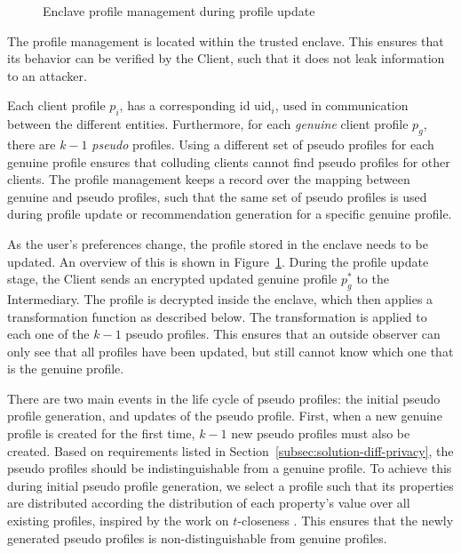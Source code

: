 {\begin{figure}[ht]
	\caption{Enclave profile management during profile update}
	\label{fig:impl-profilemanagement}
\end{figure}

The profile management is located within the trusted enclave.
This ensures that its behavior can be verified by the Client, such that it does not leak information to an attacker.

Each client profile $p_i$, has a corresponding id $\text{uid}_i$, used in communication between the different entities.
Furthermore, for each \emph{genuine} client profile $p_g$, there are $k-1$ \emph{pseudo} profiles.
Using a different set of pseudo profiles for each genuine profile ensures that colluding clients cannot find pseudo profiles for other clients.
The profile management keeps a record over the mapping between genuine and pseudo profiles, such that the same set of pseudo profiles is used during profile update or recommendation generation for a specific genuine profile.

As the user's preferences change, the profile stored in the enclave needs to be updated.
An overview of this is shown in Figure~\ref{fig:impl-profilemanagement}.
During the profile update stage, the Client sends an encrypted updated genuine profile $p_g^*$ to the Intermediary.
The profile is decrypted inside the enclave, which then applies a transformation function as described below. 
The transformation is applied to each one of the $k-1$ pseudo profiles.
This ensures that an outside observer can only see that all profiles have been updated, but still cannot know which one that is the genuine profile.

There are two main events in the life cycle of pseudo profiles: the initial pseudo profile generation, and updates of the pseudo profile.
First, when a new genuine profile is created for the first time, $k-1$ new pseudo profiles must also be created.
Based on requirements listed in Section~\ref{subsec:solution-diff-privacy}, the pseudo profiles should be indistinguishable from a genuine profile.
To achieve this during initial pseudo profile generation, we select a profile such that its properties are distributed according the distribution of each property's value over all existing profiles, inspired by the work on $t$-closeness \cite{li:2007}.
This ensures that the newly generated pseudo profiles is non-distinguishable from genuine profiles.

}
